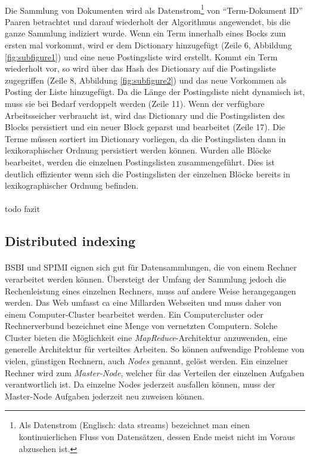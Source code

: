 \paragraph{}
 Die Sammlung von Dokumenten wird als Datenstrom\footnote{Als Datenstrom (Englisch: data streams) bezeichnet man einen kontinuierlichen Fluss von Datensätzen, dessen Ende meist nicht im Voraus abzusehen ist.} von \enquote{Term-Dokument ID} Paaren betrachtet und darauf wiederholt der Algorithmus angewendet, bis die ganze Sammlung indiziert wurde. Wenn ein Term innerhalb eines Bocks zum ersten mal vorkommt, wird er dem Dictionary hinzugefügt (Zeile 6, Abbildung \ref{fig:subfigure1}) und eine neue Postingsliste wird erstellt. Kommt ein Term wiederholt vor, so wird über das Hash des Dictionary auf die Postingsliste zugegriffen (Zeile 8, Abbildung \ref{fig:subfigure2}) und das neue Vorkommen als Posting der Liste hinzugefügt. Da die Länge der Postingsliste nicht dynamisch ist, muss sie bei Bedarf verdoppelt werden (Zeile 11). Wenn der verfügbare Arbeitsseicher verbraucht ist, wird das Dictionary und die Postingslisten des Blocks persistiert und ein neuer Block geparst und bearbeitet (Zeile 17). Die Terme müssen sortiert im Dictionary vorliegen, da die Postingslisten dann in lexikoraphischer Ordnung persistiert werden können. Wurden alle Blöcke bearbeitet, werden die einzelnen Postingslisten zusammengeführt. Dies ist deutlich effizienter wenn sich die Postingslisten der einzelnen Blöcke bereits in lexikographischer Ordnung befinden.\par

\paragraph{}
todo fazit\par

\subsection{Distributed indexing}
\paragraph{}
BSBI und SPIMI eignen sich gut für Datensammlungen, die von einem Rechner verarbeitet werden können. Übersteigt der Umfang der Sammlung jedoch die Rechenleistung eines einzelnen Rechners, muss auf andere Weise herangegangen werden. Das Web umfasst ca eine Millarden Webseiten und muss daher von einem Computer-Cluster bearbeitet werden. Ein Computercluster oder Rechnerverbund bezeichnet eine Menge von vernetzten Computern. Solche Cluster bieten die Möglichkeit eine \textit{MapReduce}-Architektur anzuwenden, eine generelle Architektur für verteiltes Arbeiten. So können aufwendige Probleme von vielen, günstigen Rechnern, auch \textit{Nodes} genannt, gelöst werden. Ein einzelner Rechner wird zum \textit{Master-Node}, welcher für das Verteilen der einzelnen Aufgaben verantwortlich ist. Da einzelne Nodes jederzeit ausfallen können, muss der Master-Node Aufgaben jederzeit neu zuweisen können.\par

